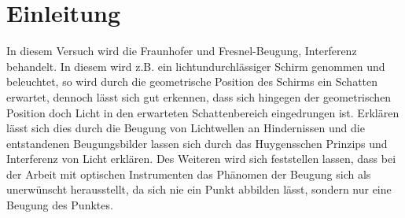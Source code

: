 \documentclass[../protokoll.tex]{subfiles}
\begin{document}
\part{Einleitung}
In diesem Versuch wird die Fraunhofer und Fresnel-Beugung, Interferenz behandelt. In diesem wird z.B. ein lichtundurchlässiger Schirm genommen und beleuchtet, so wird durch die geometrische Position des Schirms ein Schatten erwartet, dennoch lässt sich gut erkennen, dass sich hingegen der geometrischen Position doch Licht in den erwarteten Schattenbereich eingedrungen ist. Erklären lässt sich dies durch die Beugung von Lichtwellen an Hindernissen und die entstandenen Beugungsbilder lassen sich durch das Huygensschen Prinzips und Interferenz von Licht erklären. Des Weiteren wird sich feststellen lassen, dass bei der Arbeit mit optischen Instrumenten das Phänomen der Beugung sich als unerwünscht herausstellt, da sich nie ein Punkt abbilden lässt, sondern nur eine Beugung des Punktes.  
\end{document}
